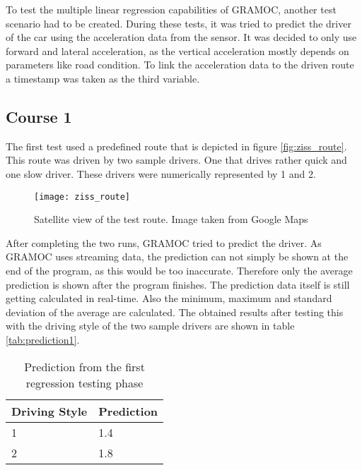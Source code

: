 
To test the multiple linear regression capabilities of GRAMOC, another test scenario had to be created. During these tests, it was tried to predict the driver of the car using the acceleration data from the sensor. It was decided to only use forward and lateral acceleration, as the vertical acceleration mostly depends on parameters like road condition. To link the acceleration data to the driven route a timestamp was taken as the third variable.

\subsection{Course 1}

The first test used a predefined route that is depicted in figure \vref{fig:ziss_route}. This route was driven by two sample drivers. One that drives rather quick and one slow driver. These drivers were numerically represented by 1 and 2.

\begin{figure}[H]
    \centering
    \texttt{[image: ziss\_route]}
    \caption{Satellite view of the test route. Image taken from Google Maps}
    \label{fig:ziss_route}
\end{figure}

After completing the two runs, GRAMOC tried to predict the driver. As GRAMOC uses streaming data, the prediction can not simply be shown at the end of the program, as this would be too inaccurate. Therefore only the average prediction is shown after the program finishes. The prediction data itself is still getting calculated in real-time. Also the minimum, maximum and standard deviation of the average are calculated. The obtained results after testing this with the driving style of the two sample drivers are shown in table \vref{tab:prediction1}.

\begin{table}[H]
\centering
\begin{tabular}{|l|l|}
\hline
\textbf{Driving Style} & \textbf{Prediction} \\ \hline
1                      & 1.4                 \\ \hline
2                      & 1.8                 \\ \hline
\end{tabular}
\caption{Prediction from the first regression testing phase}
\label{tab:prediction1}
\end{table}

